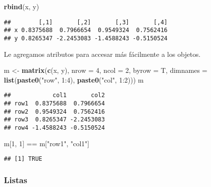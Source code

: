 \documentclass[]{article}
\newenvironment{Shaded}{\begin{snugshade}}{\end{snugshade}}
\newcommand{\KeywordTok}[1]{\textcolor[rgb]{0.13,0.29,0.53}{\textbf{{#1}}}}
\newcommand{\DataTypeTok}[1]{\textcolor[rgb]{0.13,0.29,0.53}{{#1}}}
\newcommand{\DecValTok}[1]{\textcolor[rgb]{0.00,0.00,0.81}{{#1}}}
\newcommand{\StringTok}[1]{\textcolor[rgb]{0.31,0.60,0.02}{{#1}}}
\newcommand{\NormalTok}[1]{{#1}}
\begin{document}
\begin{Shaded}
\begin{Highlighting}[]
\KeywordTok{rbind}\NormalTok{(x, y)}
\end{Highlighting}
\end{Shaded}

\begin{verbatim}
##        [,1]       [,2]       [,3]       [,4]
## x 0.8375688  0.7966654  0.9549324  0.7562416
## y 0.8265347 -2.2453083 -1.4588243 -0.5150524
\end{verbatim}

Le agregamos atributos para accesar más fácilmente a los objetos.

\begin{Shaded}
\begin{Highlighting}[]
\NormalTok{m <-}\StringTok{ }\KeywordTok{matrix}\NormalTok{(}\KeywordTok{c}\NormalTok{(x, y), }\DataTypeTok{nrow =} \DecValTok{4}\NormalTok{, }\DataTypeTok{ncol =} \DecValTok{2}\NormalTok{, }\DataTypeTok{byrow =} \NormalTok{T,}
            \DataTypeTok{dimnames =} \KeywordTok{list}\NormalTok{(}\KeywordTok{paste0}\NormalTok{(}\StringTok{"row"}\NormalTok{, }\DecValTok{1}\NormalTok{:}\DecValTok{4}\NormalTok{),}
                            \KeywordTok{paste0}\NormalTok{(}\StringTok{"col"}\NormalTok{, }\DecValTok{1}\NormalTok{:}\DecValTok{2}\NormalTok{)))}
\NormalTok{m}
\end{Highlighting}
\end{Shaded}

\begin{verbatim}
##            col1       col2
## row1  0.8375688  0.7966654
## row2  0.9549324  0.7562416
## row3  0.8265347 -2.2453083
## row4 -1.4588243 -0.5150524
\end{verbatim}

\begin{Shaded}
\begin{Highlighting}[]
\NormalTok{m[}\DecValTok{1}\NormalTok{, }\DecValTok{1}\NormalTok{] ==}\StringTok{ }\NormalTok{m[}\StringTok{"row1"}\NormalTok{, }\StringTok{"col1"}\NormalTok{]}
\end{Highlighting}
\end{Shaded}

\begin{verbatim}
## [1] TRUE
\end{verbatim}

\subsubsection{Listas}\label{listas}
\end{document}
